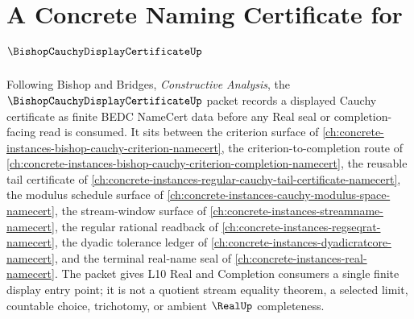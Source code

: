 \chapter{A Concrete Naming Certificate for $\BishopCauchyDisplayCertificateUp$}
\label{ch:concrete-instances-bishop-cauchy-display-certificate-namecert}

Following Bishop and Bridges, \emph{Constructive Analysis}, the $\BishopCauchyDisplayCertificateUp$ packet records a displayed Cauchy certificate as finite BEDC NameCert data before any Real seal or completion-facing read is consumed. It sits between the criterion surface of \autoref{ch:concrete-instances-bishop-cauchy-criterion-namecert}, the criterion-to-completion route of \autoref{ch:concrete-instances-bishop-cauchy-criterion-completion-namecert}, the reusable tail certificate of \autoref{ch:concrete-instances-regular-cauchy-tail-certificate-namecert}, the modulus schedule surface of \autoref{ch:concrete-instances-cauchy-modulus-space-namecert}, the stream-window surface of \autoref{ch:concrete-instances-streamname-namecert}, the regular rational readback of \autoref{ch:concrete-instances-regseqrat-namecert}, the dyadic tolerance ledger of \autoref{ch:concrete-instances-dyadicratcore-namecert}, and the terminal real-name seal of \autoref{ch:concrete-instances-real-namecert}. The packet gives L10 Real and Completion consumers a single finite display entry point; it is not a quotient stream equality theorem, a selected limit, countable choice, trichotomy, or ambient $\RealUp$ completeness.

